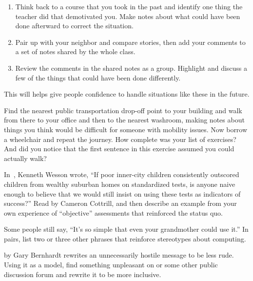 \begin{enumerate}
\item
  Think back to a course that you took in the past
  and identify one thing the teacher did that demotivated you.
  Make notes about what could have been done afterward to correct the situation.
\item
  Pair up with your neighbor and compare stories,
  then add your comments to a set of notes shared by the whole class.
\item
  Review the comments in the shared notes as a group.
  Highlight and discuss a few of the things that could have been done differently.
\end{enumerate}

This will helps give people confidence to handle situations like these in the future.


Find the nearest public transportation drop-off point to your building
and walk from there to your office and then to the nearest washroom,
making notes about things you think would be difficult for someone with mobility issues.
Now borrow a wheelchair and repeat the journey.
How complete was your list of exercises?
And did you notice that the first sentence in this exercise assumed you could actually walk?


In~\cite{Litt2004},
Kenneth Wesson wrote,
``If poor inner-city children consistently outscored children from wealthy suburban homes on standardized tests,
is anyone naive enough to believe that we would still insist on using these tests as indicators of success?''
Read 
by Cameron Cottrill,
and then describe an example from your own experience of ``objective'' assessments that reinforced the status quo.


Some people still say, ``It's so simple that even your grandmother could use it.''
In pairs,
list two or three other phrases that reinforce stereotypes about computing.


by Gary Bernhardt
rewrites an unnecessarily hostile message to be less rude.
Using it as a model,
find something unpleasant on  or some other public discussion forum
and rewrite it to be more inclusive.

